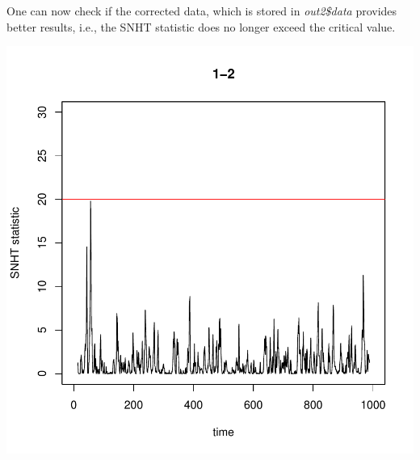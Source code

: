 \documentclass[nojss]{jss}
\begin{document}
One can now check if the corrected data, which is stored in \textit{out2\$data} provides better results, i.e., the SNHT statistic does no longer exceed the critical value.

\begin{Schunk}
\end{Schunk}
\includegraphics{pairwiseSNHT-011}



\end{document}
